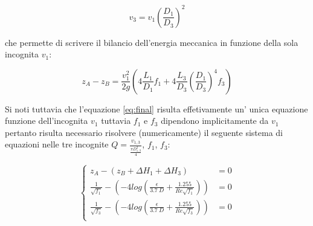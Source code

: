 \documentclass[oneside]{article}
\begin{document}
\begin{equation}
   v_3 = v_1 \left(\frac{D_1}{D_3}\right)^2
\end{equation}

che permette di scrivere il bilancio dell’energia meccanica in funzione della sola
incognita $v_1$:

\begin{equation}\label{eq:final}
   z_A - z_B = \frac{v_{1}^{2}}{2g}\left(4 \frac{L_1}{D_1} f_1 + 4
   \frac{L_3}{D_3}\left(\frac{D_1}{D_3}\right)^4 f_3 \right)
\end{equation}

Si noti tuttavia che l'equazione \ref{eq:final} risulta effetivamente un' unica equazione
funzione dell'incognita $v_1$ tuttavia $f_1$ e $f_3$ dipendono implicitamente da $v_1$
pertanto risulta necessario risolvere (numericamente) il seguente sistema di equazioni
nelle tre incognite $Q = \frac{v_{1, 3}}{\frac{\pi D_{1,3}^2}{4}}$, $f_1$, $f_3$:

\begin{equation}
   \begin{cases}
      z_A - \left(z_B  + \Delta H_1 + \Delta H_3 \right) &= 0 \\
      \frac{1}{\sqrt{f_1}} - \left(-4 log\left(\frac{\epsilon}{3.7 \: D} + \frac{1.255}{Re
      \sqrt{f_1}}\right)\right) &= 0 \\
      \frac{1}{\sqrt{f_3}} - \left(-4 log\left(\frac{\epsilon}{3.7 \: D} + \frac{1.255}{Re
      \sqrt{f_3}}\right)\right) &= 0 \\
   \end{cases}
\end{equation}
\end{document}
